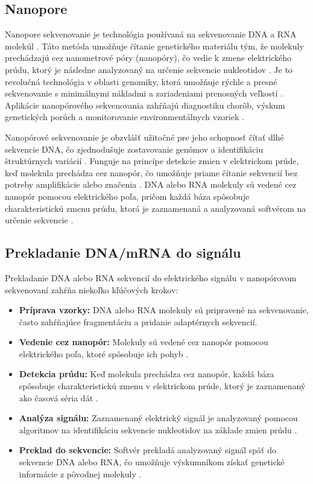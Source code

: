 \subsection{Nanopore}


Nanopore sekvenovanie je technológia používaná na sekvenovanie DNA a RNA molekúl \cite{Zheng2023Nanopore}. Táto metóda umožňuje čítanie genetického materiálu tým, že molekuly prechádzajú cez nanometrové póry (nanopóry), čo vedie k zmene elektrického prúdu, ktorý je následne analyzovaný na určenie sekvencie nukleotidov \cite{Zheng2023Nanopore}.
Je to revolučná technológia v oblasti genomiky, ktorá umožňuje rýchle a presné sekvenovanie s minimálnymi nákladmi a zariadeniami prenosných veľkostí \cite{Zheng2023Nanopore}.
Aplikácie nanopórového sekvenovania zahŕňajú diagnostiku chorôb, výskum genetických porúch a monitorovanie environmentálnych vzoriek \cite{Zheng2023Nanopore}.


Nanopórové sekvenovanie je obzvlášť užitočné pre jeho schopnosť čítať dlhé sekvencie DNA, čo zjednodušuje zostavovanie genómov a identifikáciu štruktúrnych variácií \cite{Zheng2023Nanopore,Lopez2019DNA}.
Funguje na princípe detekcie zmien v elektrickom prúde, keď molekula prechádza cez nanopór, čo umožňuje priame čítanie sekvencií bez potreby amplifikácie alebo značenia \cite{Zheng2023Nanopore}.
DNA alebo RNA molekuly sú vedené cez nanopór pomocou elektrického poľa, pričom každá báza spôsobuje charakteristickú zmenu prúdu, ktorá je zaznamenaná a analyzovaná softvérom na určenie sekvencie \cite{Zheng2023Nanopore}.

\subsection{Prekladanie DNA/mRNA do signálu}

Prekladanie DNA alebo RNA sekvencií do elektrického signálu v nanopórovom sekvenovaní \cite{Zheng2023Nanopore} zahŕňa niekoľko kľúčových krokov:
\begin{itemize}
    \item \textbf{Príprava vzorky:} DNA alebo RNA molekuly sú pripravené na sekvenovanie, často zahŕňajúce fragmentáciu a pridanie adaptérnych sekvencií.
    \item \textbf{Vedenie cez nanopór:} Molekuly sú vedené cez nanopór pomocou elektrického poľa, ktoré spôsobuje ich pohyb \cite{Zheng2023Nanopore}.
    \item \textbf{Detekcia prúdu:} Keď molekula prechádza cez nanopór, každá báza spôsobuje charakteristickú zmenu v elektrickom prúde, ktorý je zaznamenaný ako časová séria dát \cite{Zheng2023Nanopore}.
    \item \textbf{Analýza signálu:} Zaznamenaný elektrický signál je analyzovaný pomocou algoritmov na identifikáciu sekvencie nukleotidov na základe zmien prúdu \cite{Zheng2023Nanopore}.
    \item \textbf{Preklad do sekvencie:} Softvér prekladá analyzovaný signál späť do sekvencie DNA alebo RNA, čo umožňuje výskumníkom získať genetické informácie z pôvodnej molekuly \cite{Zheng2023Nanopore}.
\end{itemize}

